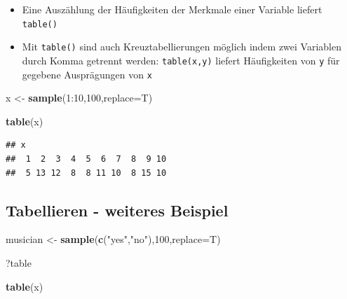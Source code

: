 \documentclass[]{article}
\newenvironment{Shaded}{\begin{snugshade}}{\end{snugshade}}
\newcommand{\KeywordTok}[1]{\textcolor[rgb]{0.13,0.29,0.53}{\textbf{{#1}}}}
\newcommand{\DataTypeTok}[1]{\textcolor[rgb]{0.13,0.29,0.53}{{#1}}}
\newcommand{\DecValTok}[1]{\textcolor[rgb]{0.00,0.00,0.81}{{#1}}}
\newcommand{\StringTok}[1]{\textcolor[rgb]{0.31,0.60,0.02}{{#1}}}
\newcommand{\NormalTok}[1]{{#1}}
\providecommand{\tightlist}{%
  \setlength{\itemsep}{0pt}\setlength{\parskip}{0pt}}
\begin{document}
\begin{itemize}
\tightlist
\item
  Eine Auszählung der Häufigkeiten der Merkmale einer Variable liefert
  \texttt{table()}
\item
  Mit \texttt{table()} sind auch Kreuztabellierungen möglich indem zwei
  Variablen durch Komma getrennt werden: \texttt{table(x,y)} liefert
  Häufigkeiten von \texttt{y} für gegebene Ausprägungen von \texttt{x}
\end{itemize}

\begin{Shaded}
\begin{Highlighting}[]
\NormalTok{x <-}\StringTok{ }\KeywordTok{sample}\NormalTok{(}\DecValTok{1}\NormalTok{:}\DecValTok{10}\NormalTok{,}\DecValTok{100}\NormalTok{,}\DataTypeTok{replace=}\NormalTok{T)}

\KeywordTok{table}\NormalTok{(x)}
\end{Highlighting}
\end{Shaded}

\begin{verbatim}
## x
##  1  2  3  4  5  6  7  8  9 10 
##  5 13 12  8  8 11 10  8 15 10
\end{verbatim}

\subsection{Tabellieren - weiteres
Beispiel}\label{tabellieren---weiteres-beispiel}

\begin{Shaded}
\begin{Highlighting}[]
\NormalTok{musician <-}\StringTok{ }\KeywordTok{sample}\NormalTok{(}\KeywordTok{c}\NormalTok{(}\StringTok{"yes"}\NormalTok{,}\StringTok{"no"}\NormalTok{),}\DecValTok{100}\NormalTok{,}\DataTypeTok{replace=}\NormalTok{T)}
\end{Highlighting}
\end{Shaded}

\begin{Shaded}
\begin{Highlighting}[]
\NormalTok{?table}
\end{Highlighting}
\end{Shaded}

\begin{Shaded}
\begin{Highlighting}[]
\KeywordTok{table}\NormalTok{(x)}
\end{Highlighting}
\end{Shaded}
\end{document}

